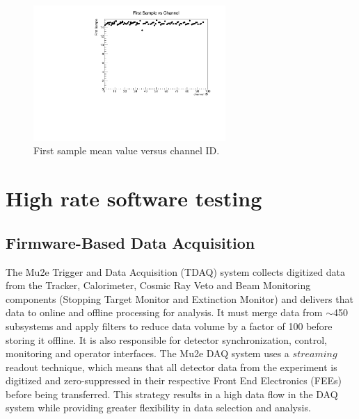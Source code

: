 \begin{figure}[!h]
  \centering
  \includegraphics[width=0.65\textwidth]{figures/pdf/fs_vs_ch1.pdf}
  \caption{First sample mean value versus channel ID.}
  \label{fig:fsvsch}
\end{figure}







\section{High rate software testing}
\subsection{Firmware-Based Data Acquisition}
The Mu2e Trigger and Data Acquisition (TDAQ) system collects digitized data from the Tracker, 
Calorimeter, Cosmic Ray Veto and Beam Monitoring components (Stopping Target Monitor and Extinction Monitor) 
and delivers that data to online and offline processing for analysis. It must merge data from $\sim$450 subsystems 
and apply filters to reduce data volume by a factor of 100 before storing it offline. It is also responsible for 
detector synchronization, control, monitoring and operator interfaces. The Mu2e DAQ system uses a $streaming$ readout technique, 
which means that all detector data from the experiment is digitized and zero-suppressed in their respective Front End Electronics 
(FEEs) before being transferred. This strategy results in a high data flow in the DAQ system while providing greater flexibility in data selection and analysis.
